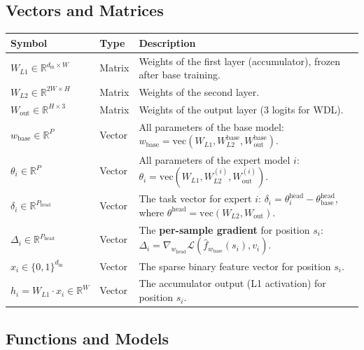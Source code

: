 \subsection{Vectors and Matrices}\label{sec:notation-vectors}

\begin{center}
\small
\begin{tabularx}{\textwidth}{@{}>{\raggedright\arraybackslash}p{} l X@{}}
\hline
\textbf{Symbol} & \textbf{Type} & \textbf{Description} \\
\hline
\(W_{L1} \in \mathbb{R}^{d_{\mathrm{in}} \times W}\) &
  Matrix &
  Weights of the first layer (accumulator), frozen after base training. \\
\(W_{L2} \in \mathbb{R}^{2W \times H}\) &
  Matrix &
  Weights of the second layer. \\
\(W_{\mathrm{out}} \in \mathbb{R}^{H \times 3}\) &
  Matrix &
  Weights of the output layer (3 logits for WDL). \\
\(w_{\mathrm{base}} \in \mathbb{R}^{P}\) &
  Vector &
  All parameters of the base model: \(w_{\mathrm{base}} = \mathrm{vec}(W_{L1}, W_{L2}^{\mathrm{base}}, W_{\mathrm{out}}^{\mathrm{base}})\). \\
\(\theta_i \in \mathbb{R}^{P}\) &
  Vector &
  All parameters of the expert model \(i\): \(\theta_i = \mathrm{vec}(W_{L1}, W_{L2}^{(i)}, W_{\mathrm{out}}^{(i)})\). \\
\(\delta_i \in \mathbb{R}^{P_{\mathrm{head}}}\) &
  Vector &
  The task vector for expert \(i\): \(\delta_i = \theta_i^{\mathrm{head}} - \theta_{\mathrm{base}}^{\mathrm{head}}\), where \(\theta^{\mathrm{head}} = \mathrm{vec}(W_{L2}, W_{\mathrm{out}})\). \\
\(\Delta_i \in \mathbb{R}^{P_{\mathrm{head}}}\) &
  Vector &
  The \textbf{per-sample gradient} for position \(s_i\): \(\Delta_i = \nabla_{w_{\mathrm{head}}} \mathcal{L}(\hat{f}_{w_{\mathrm{base}}}(s_i), v_i)\). \\
\(x_i \in \{0,1\}^{d_{\mathrm{in}}}\) &
  Vector &
  The sparse binary feature vector for position \(s_i\). \\
\(h_i = W_{L1} \cdot x_i \in \mathbb{R}^{W}\) &
  Vector &
  The accumulator output (L1 activation) for position \(s_i\). \\
\hline
\end{tabularx}
\end{center}

\subsection{Functions and Models}\label{sec:notation-functions}

